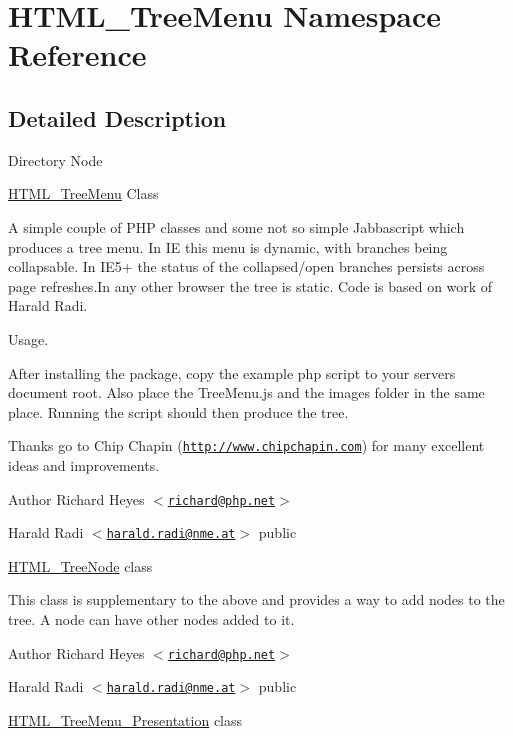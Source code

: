 \hypertarget{namespace_h_t_m_l___tree_menu}{\section{\-H\-T\-M\-L\-\_\-\-Tree\-Menu \-Namespace \-Reference}
\label{namespace_h_t_m_l___tree_menu}
}


\subsection{\-Detailed \-Description}
\-Directory \-Node

\hyperlink{class_h_t_m_l___tree_menu}{\-H\-T\-M\-L\-\_\-\-Tree\-Menu} \-Class

\-A simple couple of \-P\-H\-P classes and some not so simple \-Jabbascript which produces a tree menu. \-In \-I\-E this menu is dynamic, with branches being collapsable. \-In \-I\-E5+ the status of the collapsed/open branches persists across page refreshes.\-In any other browser the tree is static. \-Code is based on work of \-Harald \-Radi.

\-Usage.

\-After installing the package, copy the example php script to your servers document root. \-Also place the \-Tree\-Menu.\-js and the images folder in the same place. \-Running the script should then produce the tree.

\-Thanks go to \-Chip \-Chapin (\href{http://www.chipchapin.com}{\tt http\-://www.\-chipchapin.\-com}) for many excellent ideas and improvements.

\begin{DoxyAuthor}{\-Author}
\-Richard \-Heyes $<$\href{mailto:richard@php.net}{\tt richard@php.\-net}$>$ 

\-Harald \-Radi $<$\href{mailto:harald.radi@nme.at}{\tt harald.\-radi@nme.\-at}$>$  public
\end{DoxyAuthor}
\hyperlink{class_h_t_m_l___tree_node}{\-H\-T\-M\-L\-\_\-\-Tree\-Node} class

\-This class is supplementary to the above and provides a way to add nodes to the tree. \-A node can have other nodes added to it.

\begin{DoxyAuthor}{\-Author}
\-Richard \-Heyes $<$\href{mailto:richard@php.net}{\tt richard@php.\-net}$>$ 

\-Harald \-Radi $<$\href{mailto:harald.radi@nme.at}{\tt harald.\-radi@nme.\-at}$>$  public
\end{DoxyAuthor}
\hyperlink{class_h_t_m_l___tree_menu___presentation}{\-H\-T\-M\-L\-\_\-\-Tree\-Menu\-\_\-\-Presentation} class

